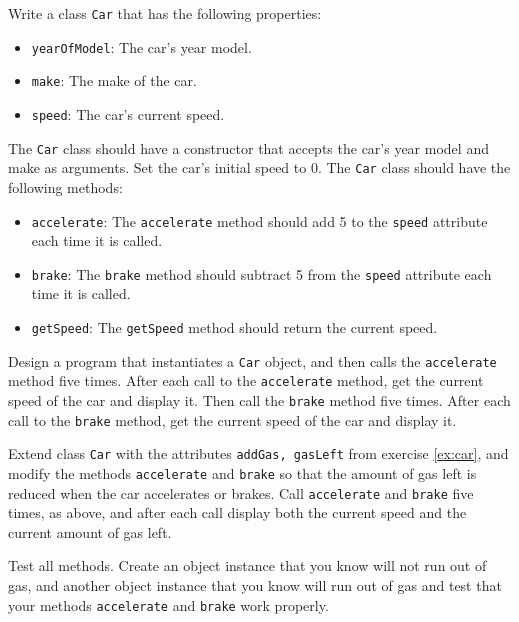 Write a class \lstinline{Car} that has the following properties:
  \begin{itemize}
  \item \lstinline{yearOfModel}: The car's year model.
  \item \lstinline{make}: The make of the car.
  \item \lstinline{speed}: The car's current speed.
  \end{itemize}
  The \lstinline{Car} class should have a constructor that accepts the car's year model and make as arguments. Set the car's initial speed to 0.  The \lstinline{Car} class should have the following methods:
  \begin{itemize}
  \item \lstinline{accelerate}: The \lstinline{accelerate} method should add 5 to the \lstinline{speed} attribute each time it is called.
  \item \lstinline{brake}: The \lstinline{brake} method should subtract 5 from the \lstinline{speed} attribute each time it is called.
  \item \lstinline{getSpeed}: The \lstinline{getSpeed} method should return the current speed.
  \end{itemize}
  Design a program that instantiates a \lstinline{Car} object, and then calls the \lstinline{accelerate} method five times. After each call to the \lstinline{accelerate} method, get the current speed of the car and display it. Then call the \lstinline{brake} method five times. After each call to the \lstinline{brake} method, get the current speed of the car and display it.

  Extend class \lstinline{Car} with the attributes \lstinline{addGas, gasLeft} from exercise \ref{ex:car}, and modify the methods \lstinline{accelerate} and \lstinline{brake} so that the amount of gas left is reduced when the car accelerates or brakes. Call \lstinline{accelerate} and \lstinline{brake} five times, as above, and after each call display both the current speed and the current amount of gas left.

  Test all methods. Create an object instance that you know will not run out of gas, and another object instance that you know will run out of gas and test that your methods \lstinline{accelerate} and \lstinline{brake} work properly.
